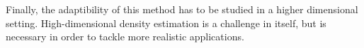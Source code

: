 \documentclass[preprint, 1p]{elsarticle}
\begin{document}
Finally, the adaptibility of this method has to be studied in a higher dimensional setting. High-dimensional density estimation is a challenge in itself, but is necessary in order to tackle more realistic applications.








 

\end{document}
